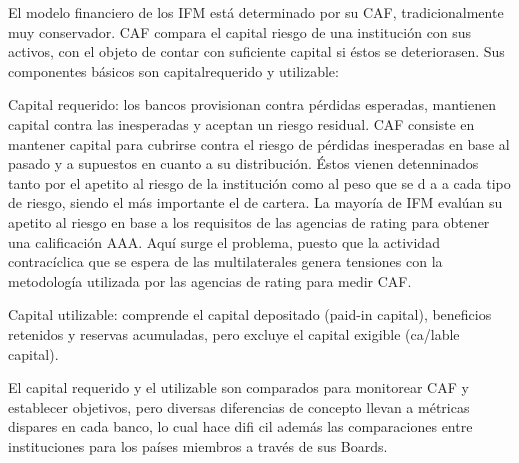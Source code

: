 \documentclass[10pt,a4paper]{article}
\begin{document}
El modelo financiero de los IFM está determinado por su CAF, tradicionalmente muy conservador. CAF compara el capital riesgo de una institución con sus activos, con el objeto de contar con suficiente capital si éstos se deteriorasen. Sus componentes básicos son capitalrequerido y utilizable:

Capital requerido: los bancos provisionan contra pérdidas esperadas, mantienen capital contra las inesperadas y aceptan un riesgo residual. CAF consiste en mantener capital para cubrirse contra el riesgo de pérdidas inesperadas en base al pasado y a supuestos en cuanto a su distribución. Éstos vienen detenninados tanto por el apetito al riesgo de la institución como al peso que se d a a cada tipo de riesgo, siendo el más importante el de cartera. La mayoría de IFM evalúan su apetito al riesgo en base a los requisitos de las agencias de rating para obtener una calificación AAA. Aquí surge el problema, puesto que la actividad contracíclica que se espera de las multilaterales genera tensiones con la metodología utilizada por las agencias de rating para medir CAF. 

Capital utilizable: comprende el capital depositado (paid-in capital), beneficios retenidos y reservas acumuladas, pero excluye el capital exigible (ca/lable capital). 

El capital requerido y el utilizable son comparados para monitorear CAF y establecer objetivos, pero diversas diferencias de concepto llevan a métricas dispares en cada banco, lo cual hace difi cil además las comparaciones entre instituciones para los países miembros a través de sus Boards.
\end{document}
